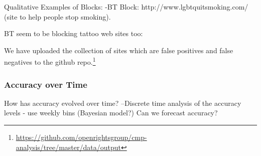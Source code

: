 \documentclass{bmcart}
\begin{document}




Qualitative Examples of Blocks:
-BT Block: http://www.lgbtquitsmoking.com/ (site to help people stop smoking).

BT seem to be blocking tattoo web sites too:

We have uploaded the collection of sites which are false positives and false negatives to the github repo.\footnote{\url{https://github.com/openrightsgroup/cmp-analysis/tree/master/data/output}}


\subsubsection*{Accuracy over Time}
How has accuracy evolved over time?
--Discrete time analysis of the accuracy levels - use weekly bins (Bayesian model?) Can we forecast accuracy?
\end{document}
